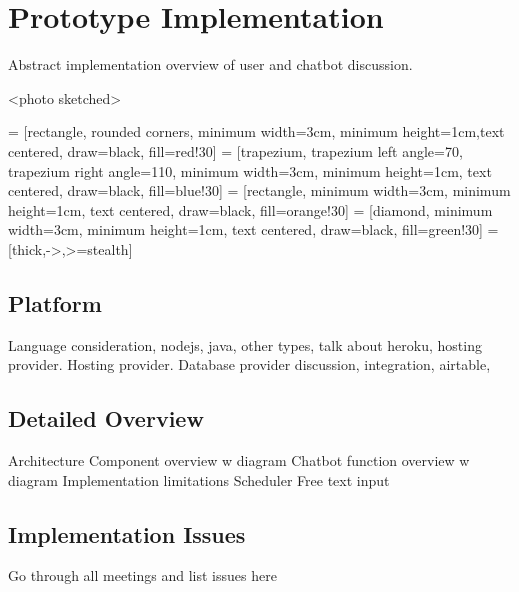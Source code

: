 \section{Prototype Implementation}

Abstract implementation overview of user and chatbot discussion.

<photo sketched>

 = [rectangle, rounded corners, minimum width=3cm, minimum height=1cm,text centered, draw=black, fill=red!30]
 = [trapezium, trapezium left angle=70, trapezium right angle=110, minimum width=3cm, minimum height=1cm, text centered, draw=black, fill=blue!30]
 = [rectangle, minimum width=3cm, minimum height=1cm, text centered, draw=black, fill=orange!30]
 = [diamond, minimum width=3cm, minimum height=1cm, text centered, draw=black, fill=green!30]
 = [thick,->,>=stealth]


\subsection{Platform}

Language consideration, nodejs, java, other types, talk about heroku, hosting provider. Hosting provider.
Database provider discussion, integration, airtable,

\subsection{Detailed Overview}

Architecture Component overview w diagram\newline
Chatbot function overview w diagram\newline
Implementation limitations\newline
Scheduler\newline
Free text input\newline

\subsection{Implementation Issues}

Go through all meetings and list issues here


\newpage
